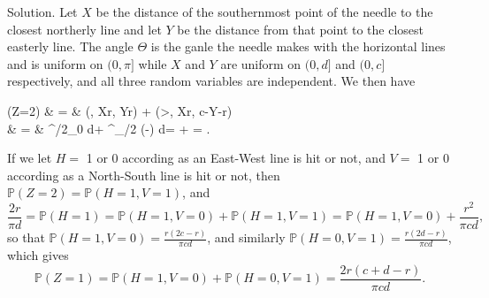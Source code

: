 Solution. Let $X$ be the distance of the southernmost point of the needle to the closest northerly line and let $Y$ be the distance from that point to the closest easterly line. The angle $\Theta$ is the ganle the needle makes with the horizontal lines and is uniform on $(0,\pi]$ while $X$ and $Y$ are uniform on $(0,d]$ and $(0,c]$ respectively, and all three random variables are independent.
We then have

\beast
{}(Z=2) & = &  \left(\Theta\leq \frac {}, X\leq r\sin\Theta, Y\leq r\cos\Theta \right) + \left(\Theta>\frac {}, X\leq r\sin\Theta, c-Y\leq -r\cos\Theta \right) \\
& = & \pi \int^{\pi/2}_0 \sin\theta \cos\theta d\theta + \pi \int^\pi_{\pi/2} \sin\theta (-\cos\theta) d\theta \nonumber=  +  = .
\eeast

If we let $H=$ 1 or 0 according as an East-West line is hit or not, and $V=$ 1 or 0 according as a North-South line is hit or not, then $\mathbb{P}(Z=2)=\mathbb{P}(H=1,V=1)$, and 
\begin{equation}
\frac{2r}{\pi d} = \mathbb{P}(H=1) = \mathbb{P}(H=1,V=0) + \mathbb{P}(H=1,V=1) = \mathbb{P}(H=1,V=0) + \frac{r^2}{\pi cd}, 
\end{equation}
so that $\mathbb{P}(H=1,V=0) = \frac{r(2c-r)}{\pi cd}$, and similarly $\mathbb{P}(H=0,V=1) = \frac{r(2d-r)}{\pi cd}$, which gives 
\begin{equation}
\mathbb{P}(Z=1) = \mathbb{P}(H=1,V=0) + \mathbb{P}(H=0,V=1) = \frac{2r(c+d-r)}{\pi cd}.
\end{equation}

